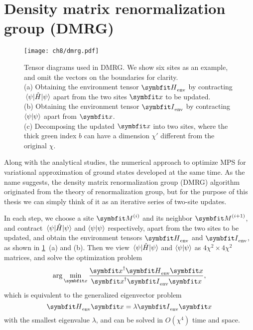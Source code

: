 \section{Density matrix renormalization group (DMRG)}
\label{sec:dmrg}

\begin{figure}[htb]
\centering
\texttt{[image: ch8/dmrg.pdf]}
\caption[Density matrix renormalization group (DMRG)]{
Tensor diagrams used in DMRG. We show six sites as an example, and omit the vectors on the boundaries for clarity. \\
(a) Obtaining the environment tensor $\mH_\text{env}$ by contracting $\mel{\psi}{\hat{H}}{\psi}$ apart from the two sites $\vx$ to be updated. \\
(b) Obtaining the environment tensor $\mI_\text{env}$ by contracting $\ip{\psi}$ apart from $\vx$. \\
(c) Decomposing the updated $\vx$ into two sites, where the thick green index $b$ can have a dimension $\chi'$ different from the original $\chi$.
}
\label{fig:dmrg}
\end{figure}

Along with the analytical studies, the numerical approach to optimize MPS for variational approximation of ground states developed at the same time. As the name suggests, the density matrix renormalization group (DMRG) algorithm~\cite{white1992density, schollwock2005density} originated from the theory of renormalization group, but for the purpose of this thesis we can simply think of it as an iterative series of two-site updates.

In each step, we choose a site $\mM^{(i)}$ and its neighbor $\mM^{(i + 1)}$, and contract $\mel{\psi}{\hat{H}}{\psi}$ and $\ip{\psi}$ respectively, apart from the two sites to be updated, and obtain the environment tensors $\mH_\text{env}$ and $\mI_\text{env}$, as shown in \cref{fig:dmrg}~(a) and (b). Then we view $\mel{\psi}{\hat{H}}{\psi}$ and $\ip{\psi}$ as $4 \chi^2 \times 4 \chi^2$ matrices, and solve the optimization problem
\begin{equation}
\arg\min_\vx \frac{\vx^\dagger \mH_\text{env} \vx}{\vx^\dagger \mI_\text{env} \vx},
\end{equation}
which is equivalent to the generalized eigenvector problem
\begin{equation}
\mH_\text{env} \vx = \lambda \mI_\text{env} \vx
\end{equation}
with the smallest eigenvalue $\lambda$, and can be solved in $O(\chi^4)$ time and space.


